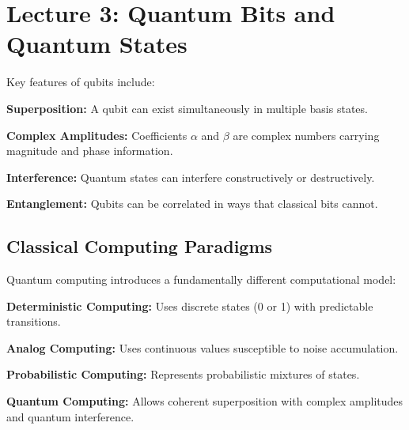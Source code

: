 \section{Lecture 3: Quantum Bits and Quantum States} \label{sec:lecture3}



\vspace{0.3cm}

\noindent
Key features of qubits include:
  \begin{itemize}
    \ii \textbf{Superposition:} A qubit can exist simultaneously in multiple
    basis states.

    \ii \textbf{Complex Amplitudes:} Coefficients $\alpha$ and $\beta$ are
    complex numbers carrying magnitude and phase information.

    \ii \textbf{Interference:} Quantum states can interfere constructively or
    destructively.

    \ii \textbf{Entanglement:} Qubits can be correlated in ways that
    classical bits cannot.

\end{itemize}

\subsection*{Classical Computing Paradigms}

Quantum computing introduces a fundamentally different computational model:
  \begin{itemize}
    \ii \textbf{Deterministic Computing:} Uses discrete states (0 or 1) with
    predictable transitions.

    \ii \textbf{Analog Computing:} Uses continuous values susceptible to
    noise accumulation.

    \ii \textbf{Probabilistic Computing:} Represents probabilistic mixtures
    of states.

    \ii \textbf{Quantum Computing:} Allows coherent superposition with
    complex amplitudes and quantum interference.
\end{itemize}


